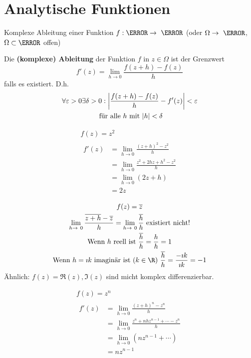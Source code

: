 \chapter{Analytische Funktionen}
Komplexe Ableitung einer Funktion $f: \C \rightarrow \C$ (oder $\Omega \rightarrow \C$, $\Omega \subset \C$ offen) \\
\begin{def*}[note = komplexe Ableitung , index = komplexe Ableitung , indexformat = {2!~1}]
	Die \textbf{(komplexe) Ableitung} der Funktion $f$ in $z \in \Omega$ ist der Grenzwert
	\[ f'(z) = \lim_{h \rightarrow 0} \frac{f(z+h) - f(z)}{h} \]
	falls es existiert. D.h.
	\begin{gather*}
		\forall \varepsilon > 0 \exists \delta > 0 : \abs{\frac{f(z+h) - f(z)}{h} - f'(z)} < \varepsilon \\
		\text{ für alle $h$ mit $\abs{h} < \delta$}
	\end{gather*}
\end{def*}
\begin{bsp}
	\begin{gather*}
		f(z) = z^2 \\
		\begin{split}
			f'(z)
				&= \lim_{h \rightarrow 0} \frac{(z+h)^2 - z^2}{h} \\
				&= \lim_{h \rightarrow 0} \frac{z^2 + 2hz + h^2 - z^2}{h} \\
				&= \lim_{h \rightarrow 0} (2z + h) \\
				&= 2z
		\end{split}
	\end{gather*}
\end{bsp}
\begin{bsp}
	\begin{gather*}
		f(z) = \overline{z} \\
		\lim_{h \rightarrow 0} \frac{\overline{z+h} - \overline{z}}{h} = \lim_{h \rightarrow 0} \frac{\overline{h}}{h} \text{ existiert nicht!} \\
		\text{Wenn $h$ reell ist } \frac{\overline{h}}{h} = \frac{h}{h} = 1 \\
		\text{Wenn $h=\imath k$ imaginär ist ($k \in \R$) } \frac{\overline{h}}{h} = \frac{-\imath k}{\imath k} = -1
	\end{gather*}
	Ähnlich: $f(z) = \Re(z) , \Im(z)$ sind micht komplex differenzierbar.
\end{bsp}
\begin{bsp}
	\begin{gather*}
		f(z) = z^n \\
		\begin{split}
			f'(z)	&= \lim_{h \rightarrow 0} \frac{(z+h)^n - z^n}{h} \\
				&= \lim_{h \rightarrow 0} \frac{z^n + nhz^{n-1} + \dotsb - z^n}{h} \\
				&= \lim_{h \rightarrow 0} (n z^{n-1} + \dotsb ) \\
				&= nz^{n-1}
		\end{split}
	\end{gather*}
\end{bsp}
